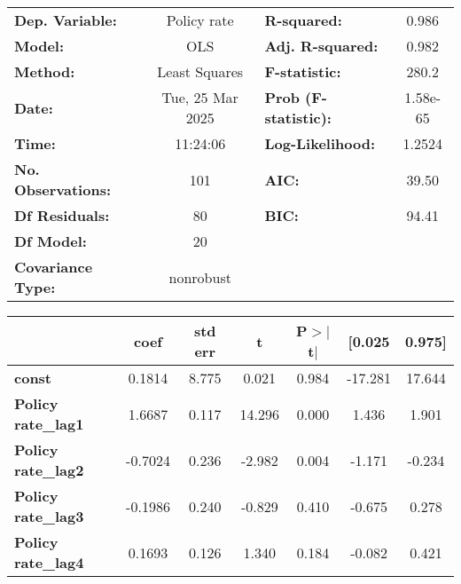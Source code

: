 \begin{center}
\begin{tabular}{lclc}
\toprule
\textbf{Dep. Variable:}         &   Policy rate    & \textbf{  R-squared:         } &     0.986   \\
\textbf{Model:}                 &       OLS        & \textbf{  Adj. R-squared:    } &     0.982   \\
\textbf{Method:}                &  Least Squares   & \textbf{  F-statistic:       } &     280.2   \\
\textbf{Date:}                  & Tue, 25 Mar 2025 & \textbf{  Prob (F-statistic):} &  1.58e-65   \\
\textbf{Time:}                  &     11:24:06     & \textbf{  Log-Likelihood:    } &    1.2524   \\
\textbf{No. Observations:}      &         101      & \textbf{  AIC:               } &     39.50   \\
\textbf{Df Residuals:}          &          80      & \textbf{  BIC:               } &     94.41   \\
\textbf{Df Model:}              &          20      & \textbf{                     } &             \\
\textbf{Covariance Type:}       &    nonrobust     & \textbf{                     } &             \\
\bottomrule
\end{tabular}
\begin{tabular}{lcccccc}
                                & \textbf{coef} & \textbf{std err} & \textbf{t} & \textbf{P$> |$t$|$} & \textbf{[0.025} & \textbf{0.975]}  \\
\midrule
\textbf{const}                  &       0.1814  &        8.775     &     0.021  &         0.984        &      -17.281    &       17.644     \\
\textbf{Policy rate\_lag1}      &       1.6687  &        0.117     &    14.296  &         0.000        &        1.436    &        1.901     \\
\textbf{Policy rate\_lag2}      &      -0.7024  &        0.236     &    -2.982  &         0.004        &       -1.171    &       -0.234     \\
\textbf{Policy rate\_lag3}      &      -0.1986  &        0.240     &    -0.829  &         0.410        &       -0.675    &        0.278     \\
\textbf{Policy rate\_lag4}      &       0.1693  &        0.126     &     1.340  &         0.184        &       -0.082    &        0.421     \\

\end{tabular}
\end{center}
